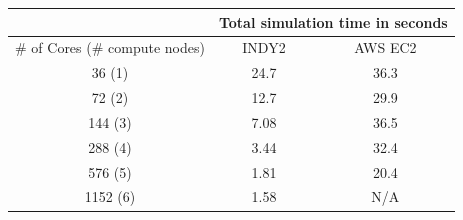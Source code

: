\begin{center}

\label{table:perf}

\begin{tabular}{|c|c|c|}
\hline
\multicolumn{1}{|l|}{}            & \multicolumn{2}{c|}{Total simulation time in seconds}               \\ \hline
\multicolumn{1}{|c|}{\# of Cores (\# compute nodes)} & \multicolumn{1}{c|}{INDY2} & \multicolumn{1}{c|}{AWS EC2} \\ \hline
36 (1)                                & 24.7                       & 36.3                         \\ \hline
72 (2)                                & 12.7                       & 29.9                         \\ \hline
144 (3)                               & 7.08                       & 36.5                         \\ \hline
288 (4)                               & 3.44                       & 32.4                         \\ \hline
576 (5)                               & 1.81                       & 20.4                         \\ \hline
1152 (6)                              & 1.58                       & N/A                             \\ \hline
\end{tabular}

\end{center}



\vspace{0.5cm}

